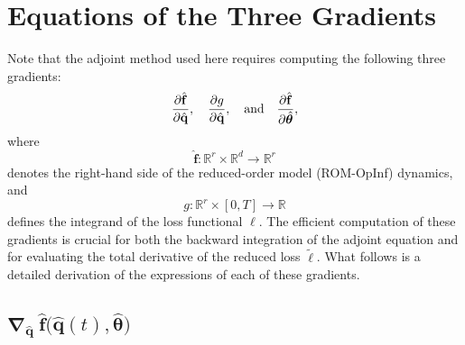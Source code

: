 
\section{Equations of the Three Gradients}
\label{sec:four_gradients}

Note that the adjoint method used here requires computing the following three gradients:\\
$$\pdv{\hat{\mathbf{f}}}{\hat{\mathbf{q}}},  \quad \pdv{g}{\hat{\mathbf{q}}}, \quad \text{and} \quad \pdv{\hat{\mathbf{f}}}{\hat{\bm{\theta}}},$$
where\\
$$\hat{\mathbf{f}}:\mathbb{R}^r \times \mathbb{R}^d \to \mathbb{R}^r$$ 
denotes the right-hand side of the reduced-order model (ROM-OpInf) dynamics, and\\
$$g:\mathbb{R}^r\times [0,T]\to \mathbb{R}$$ 
defines the integrand of the loss functional $\ell$. The efficient computation of these gradients is crucial for both the backward integration of the adjoint equation and for evaluating the total derivative of the reduced loss $\tilde\ell$. What follows is a detailed derivation of the expressions of each of these gradients.

\subsection{$\bm{\nabla}_{\hat{\mathbf{q}}}~\hat{\mathbf{f}}\bigl(\hat{\mathbf{q}}(t), \hat{\bm{\theta}}\bigr)$}

